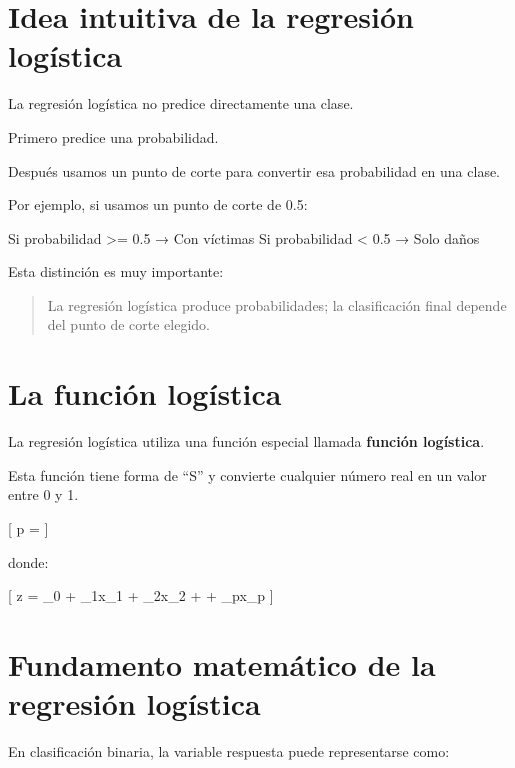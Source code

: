 \documentclass[
  11pt,
  letterpaper,
]{book}
\newenvironment{Shaded}{\begin{snugshade}}{\end{snugshade}}
\newcommand{\NormalTok}[1]{\textcolor[rgb]{0.00,0.23,0.31}{#1}}
\begin{document}
\section{Idea intuitiva de la regresión
logística}\label{idea-intuitiva-de-la-regresiuxf3n-loguxedstica}

La regresión logística no predice directamente una clase.

Primero predice una probabilidad.

Después usamos un punto de corte para convertir esa probabilidad en una
clase.

Por ejemplo, si usamos un punto de corte de 0.5:

\begin{Shaded}
\begin{Highlighting}[]
\NormalTok{Si probabilidad \textgreater{}= 0.5 → Con víctimas}
\NormalTok{Si probabilidad \textless{}  0.5 → Solo daños}
\end{Highlighting}
\end{Shaded}

Esta distinción es muy importante:

\begin{quote}
La regresión logística produce probabilidades; la clasificación final
depende del punto de corte elegido.
\end{quote}

\section{La función logística}\label{la-funciuxf3n-loguxedstica}

La regresión logística utiliza una función especial llamada
\textbf{función logística}.

Esta función tiene forma de ``S'' y convierte cualquier número real en
un valor entre 0 y 1.

{[} p =  {]}

donde:

{[} z = \beta\_0 + \beta\_1x\_1 + \beta\_2x\_2 + \cdots + \beta\_px\_p
{]}

\section{Fundamento matemático de la regresión
logística}\label{fundamento-matemuxe1tico-de-la-regresiuxf3n-loguxedstica}

En clasificación binaria, la variable respuesta puede representarse
como:
\end{document}

